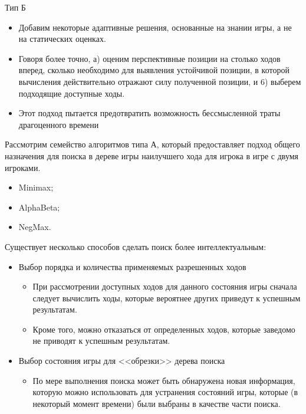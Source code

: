 \documentclass{beamer}
\begin{document}
\begin{frame}
\begin{block}{Тип Б}
\begin{itemize}
\item Добавим некоторые адаптивные решения, основанные на знании игры, а не
на статических оценках. 
\item Говоря более точно, а) оценим перспективные позиции на столько ходов вперед, сколько необходимо для выявления устойчивой позиции, в которой вычисления действительно отражают силу полученной позиции, и 6) выберем подходящие доступные ходы. 
\item Этот подход пытается предотвратить возможность бессмысленной траты драгоценного времени
\end{itemize}
\end{block}
Рассмотрим семейство алгоритмов типа А, который предоставляет
подход общего назначения для поиска в дереве игры наилучшего хода для игрока
в игре с двумя игроками. 
\begin{itemize}
\item Minimax;
\item AlphaBeta;
\item NegMax.
\end{itemize}
\end{frame}

\begin{frame}
Существует несколько способов сделать поиск более интеллектуальным:
\begin{itemize}
\item Выбор порядка и количества применяемых разрешенных ходов
	\begin{itemize}
	\item При рассмотрении доступных ходов для данного состояния игры сначала следует вычислить ходы, которые вероятнее других приведут к успешным результатам. 
	\item Кроме того, можно отказаться от определенных ходов, которые заведомо не приводят к успешным результатам.
	\end{itemize}
\item Выбор состояния игры для <<обрезки>> дерева поиска
	\begin{itemize}
	\item По мере выполнения поиска может быть обнаружена новая информация, которую можно использовать для устранения состояний игры, которые (в некоторый момент времени) были выбраны в качестве части поиска.
	\end{itemize}
\end{itemize}
\end{frame}
\end{document}
